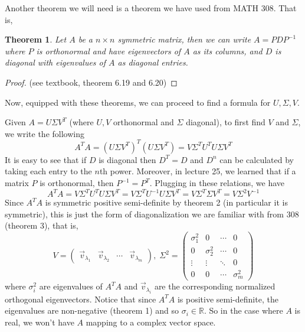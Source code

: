 \documentclass{article}
\newtheorem{theorem}{Theorem}
\begin{document}
Another theorem we will need is a theorem we have used from MATH 308. That is, 
\bigskip

\begin{theorem} Let $A$ be a $n \times n $ symmetric matrix, then we can write $A= P D P^{-1}$ where $P$ is orthonormal and have eigenvectors of $A$ as its columns, and $D$ is diagonal with eigenvalues of $A$ as diagonal entries.
\end{theorem}

\begin{proof}
(see textbook, theorem 6.19 and 6.20)
\end{proof}
\bigskip 

Now, equipped with these theorems, we can proceed to find a formula for $U, \Sigma, V$. 
\bigskip

Given $A= U \Sigma V^T$ (where $U,V$ orthonormal and $\Sigma$ diagonal), to first find $V$ and $\Sigma$, we write the following 
$$A^TA = ( U \Sigma V^T)^T ( U \Sigma V^T) = V \Sigma^T U^T U \Sigma V^T$$
It is easy to see that if $D$ is diagonal then $D^T = D$ and $D^n$ can be calculated by taking each entry to the $n$th power. Moreover, in lecture 25, we learned that if a matrix $P$ is orthonormal, then $P^{-1} = P^T$. Plugging in these relations, we have 
$$A^TA =V \Sigma^T U^T U \Sigma V^T = V \Sigma^T U^{-1} U \Sigma V^T =V \Sigma^T  \Sigma V^T = V \Sigma^2 V^{-1}$$
Since $A^TA$ is symmetric positive semi-definite by theorem 2 (in particular it is symmetric), this is just the form of diagonalization we are familiar with from 308 (theorem 3), that is, $$V = \begin{pmatrix} \vec{v}_{\lambda_1} & \vec{v}_{\lambda_2} & \cdots & \vec{v}_{\lambda_m} \end{pmatrix}, \; \Sigma^2 = \begin{pmatrix} \sigma^2_1 & 0&  \cdots & 0 \\ 0& \sigma^2_2 &\cdots & 0 \\ \vdots & \vdots & \ddots &0 \\
0 &0& \cdots & \sigma^2_m  \end{pmatrix}$$ 
where $\sigma^2_i$ are eigenvalues of $A^TA$ and $\vec{v}_{\lambda_i}$ are the corresponding normalized orthogonal eigenvectors. Notice that since $A^TA$ is positive semi-definite, the eigenvalues are non-negative (theorem 1) and so $\sigma_i \in \mathbb{R}$. So in the case where $A$ is real, we won't have $A$ mapping to a complex vector space. 
\bigskip
\end{document}
